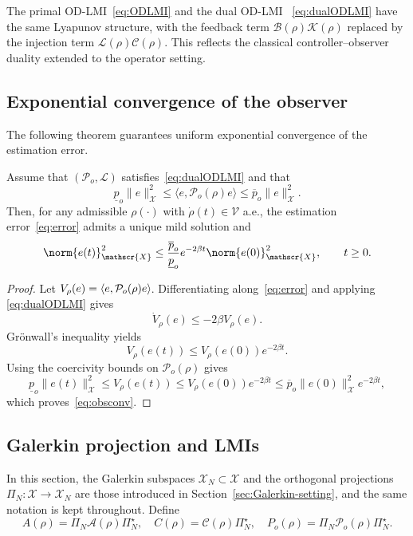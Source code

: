 \documentclass[AMA,Times2COL]{WileyNJDv5}
\newcommand{\ipX}[3][]{%
  \mathinner{\left\langle #2, #3 \right\rangle_{\!#1}}%
}
\begin{document}
\begin{remark}
The primal OD-LMI~\eqref{eq:ODLMI} and the dual OD-LMI
~\eqref{eq:dualODLMI} have the same Lyapunov structure, with the feedback term $\mathcal{B}(\rho)\mathcal{K}(\rho)$ replaced by the injection term $\mathcal{L}(\rho)\mathcal{C}(\rho)$. This reflects the classical
controller--observer duality extended to the operator setting.
\end{remark}

\subsection{Exponential convergence of the observer}

The following theorem guarantees uniform exponential convergence of the estimation error.

\begin{theorem}
\label{thm:obsconv}
Assume that $(\mathcal{P}_o,\mathcal{L})$ satisfies~\eqref{eq:dualODLMI} and
that
\[
\underline p_o\|e\|_{\mathscr X}^2
\le
\langle e,\mathcal P_o(\rho)e\rangle
\le
\overline p_o\|e\|_{\mathscr X}^2 .
\]
Then, for any admissible $\rho(\cdot)$ with
$\dot\rho(t)\in\mathcal V$ a.e., the estimation error~\eqref{eq:error}
admits a unique mild solution and
\begin{equation}\label{eq:obsconv}
\norm{e(t)}^2_{\mathscr{X}}
\le
\frac{\overline{p}_o}{\underline{p}_o}
e^{-2\beta t}
\norm{e(0)}^2_{\mathscr{X}},
\qquad t\ge0 .
\end{equation}
\end{theorem}

\begin{proof}
Let $V_\rho(e)=\ipX{e}{\mathcal{P}_o(\rho)e}$.
Differentiating along~\eqref{eq:error} and applying
\eqref{eq:dualODLMI} gives
\[
\dot V_\rho(e)
\le
-2\beta V_\rho(e).
\]
Grönwall's inequality yields
\[
V_\rho(e(t))
\le
V_\rho(e(0))e^{-2\beta t}.
\]
Using the coercivity bounds on $\mathcal P_o(\rho)$ gives
\[
\underline p_o\|e(t)\|_{\mathscr X}^2
\le
V_\rho(e(t))
\le
V_\rho(e(0))e^{-2\beta t}
\le
\overline p_o\|e(0)\|_{\mathscr X}^2e^{-2\beta t},
\]
which proves~\eqref{eq:obsconv}.
\end{proof}

\subsection{Galerkin projection and LMIs}

In this section, the Galerkin subspaces $\mathscr X_N\subset\mathscr{X}$ and the orthogonal projections $\Pi_N:\mathscr{X}\to \mathscr X_N$ are those
introduced in Section~\ref{sec:Galerkin-setting}, and the same notation is kept throughout. Define
\[
A(\rho)=\Pi_N\mathcal{A}(\rho)\Pi_N^{\star},\quad
C(\rho)=\mathcal{C}(\rho)\Pi_N^{\star},\quad
P_o(\rho)=\Pi_N\mathcal P_o(\rho)\Pi_N^\star .
\]
\end{document}
